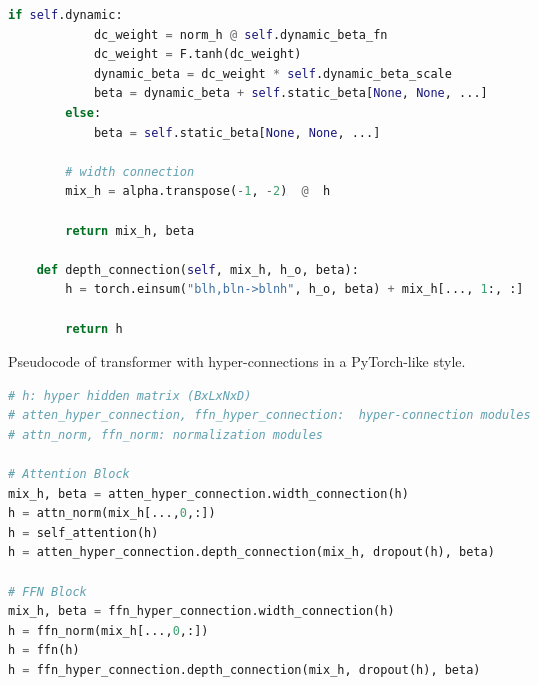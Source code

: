 \begin{algorithm}[h]
\begin{lstlisting}[language=python]
        if self.dynamic:
            dc_weight = norm_h @ self.dynamic_beta_fn
            dc_weight = F.tanh(dc_weight)
            dynamic_beta = dc_weight * self.dynamic_beta_scale
            beta = dynamic_beta + self.static_beta[None, None, ...]
        else:
            beta = self.static_beta[None, None, ...]

        # width connection
        mix_h = alpha.transpose(-1, -2)  @  h

        return mix_h, beta
    
    def depth_connection(self, mix_h, h_o, beta):
        h = torch.einsum("blh,bln->blnh", h_o, beta) + mix_h[..., 1:, :]

        return h
\end{lstlisting}
\end{algorithm}

\begin{algorithm}[h]
\caption{Pseudocode of transformer with hyper-connections in a PyTorch-like style.}
\label{alg:torch_trans_with_hc}
\algcomment{\fontsize{7.2pt}{0em}\selectfont 
}
\begin{lstlisting}[language=python]
# h: hyper hidden matrix (BxLxNxD)
# atten_hyper_connection, ffn_hyper_connection:  hyper-connection modules
# attn_norm, ffn_norm: normalization modules

# Attention Block
mix_h, beta = atten_hyper_connection.width_connection(h)
h = attn_norm(mix_h[...,0,:])
h = self_attention(h)
h = atten_hyper_connection.depth_connection(mix_h, dropout(h), beta)

# FFN Block
mix_h, beta = ffn_hyper_connection.width_connection(h)
h = ffn_norm(mix_h[...,0,:])
h = ffn(h)
h = ffn_hyper_connection.depth_connection(mix_h, dropout(h), beta)

\end{lstlisting}
\end{algorithm}

\newpage

